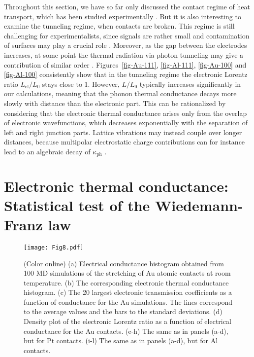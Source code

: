 \documentclass[aps,amsmath,amssymb,twocolumn,showpacs]{revtex4-1}
\begin{document}
Throughout this section, we have so far only discussed the contact regime of
heat transport, which has been studied experimentally
\cite{Mosso2017,Cui2017}.  But it is also interesting to examine the tunneling
regime, when contacts are broken. This regime is still
challenging for experimentalists, since signals are rather small and
contamination of surfaces may play a crucial role \cite{Cui2017a}.
Moreover, as the gap between the electrodes increases, at some point the
thermal radiation via photon tunneling may give a contribution of similar
order \cite{Klockner2017a}.  Figures~\ref{fig-Au-111}, \ref{fig-Al-111},
\ref{fig-Au-100} and \ref{fig-Al-100} consistently show that in the tunneling
regime the electronic Lorentz ratio $L_{\text{el}}/L_0$ stays close to
1. However, $L/L_0$ typically increases significantly in our calculations,
meaning that the phonon thermal conductance decays more slowly with distance
than the electronic part. This can be rationalized by considering that the
electronic thermal conductance arises only from the overlap of electronic
wavefunctions, which decreases exponentially with the separation of left and
right junction parts. Lattice vibrations may instead couple over longer
distances, because multipolar electrostatic charge contributions can for
instance lead to an algebraic decay of $\kappa_{\text{ph}}$
\cite{Xiong2014,Chiloyan2015}.

\section{Electronic thermal conductance: Statistical test of the Wiedemann-Franz law}\label{sec-TB-results}

%
\begin{figure*}[t]
\texttt{[image: Fig8.pdf]}
\caption{(Color online) (a) Electrical conductance histogram obtained from 100
  MD simulations of the stretching of Au atomic contacts at room
  temperature. (b) The corresponding electronic thermal conductance
  histogram. (c) The 20 largest electronic transmission coefficients as a
  function of conductance for the Au simulations. The lines correspond to the
  average values and the bars to the standard deviations. (d) Density plot of
  the electronic Lorentz ratio as a function of electrical conductance for the
  Au contacts. (e-h) The same as in panels (a-d), but for Pt contacts. (i-l)
  The same as in panels (a-d), but for Al contacts.}
\label{fig-histo}
\end{figure*}
%
\end{document}
